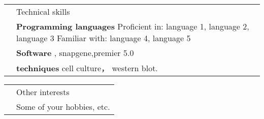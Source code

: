 \documentclass[letterpaper, 11pt]{article}
\newcommand{\headingfont}{\Large\color{OliveGreen}}
\newenvironment{SectionTable}[1]{
	\renewcommand*{\arraystretch}{1.7}
	\setlength{\tabcolsep}{10pt}
	\begin{longtable}{Rp{5.2in}} & #1 \\}
{\end{longtable}\vspace{-.3cm}}
\begin{document}
\begin{SectionTable}{\headingfont Technical skills}
& \textbf{Programming languages} \newline
Proficient in: language 1, language 2, language 3 \newline
Familiar with: language 4, language 5 \\

& \textbf{Software} \newline
\SPSS, snapgene,premier 5.0 \\

& \textbf{techniques} \newline
cell culture， western blot.
\end{SectionTable}


\begin{SectionTable}{\headingfont Other interests}
& Some of your hobbies, etc.
\end{SectionTable}

\end{document}
